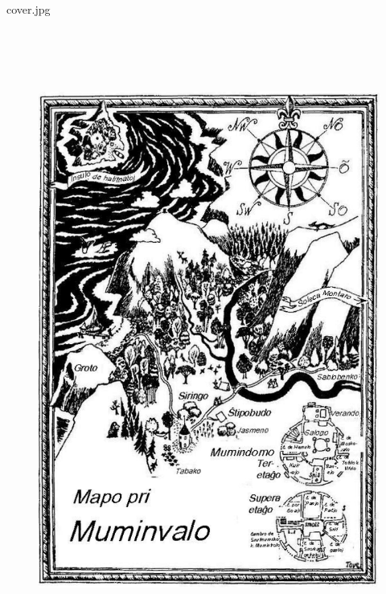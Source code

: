 
\def\mytitle{Kometo en Muminvalo}
\def\myauthor{Tove Jansson}
\def\description{Kiam Mumintrolo lernis ke kometo preterpasos, li kaj lia amiko Snif vojaĝis al la Observatorio sur la Soleca Montaro por konsulti la profesorojn. Laŭ la vojo, ili havis multajn aventurojn, sed la plej granda aventuro de ĉiuj atendis ilin kiam ili lernis ke la kometo rekte celis ilian amatan Muminvalo.}


cover.jpg

\begin{figure}[htbp]
\centering
\includegraphics[width=394pt,height=580pt]{map-bildo.png}
\caption{}
\label{map-bildo}
\end{figure}

